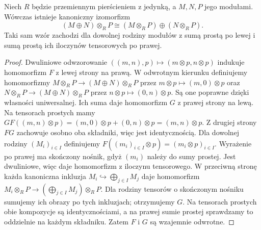 \begin{twierdzenie}
\label{aa:tw:tensor-direct-sum}
Niech $R$ będzie przemiennym pierścieniem z jedynką,
a $M,N,P$ jego modułami. Wówczas istnieje kanoniczny izomorfizm
\[
 (M\oplus N)\otimes_R P\cong
 (M\otimes_RP)\oplus(N\otimes_RP).
\]
Taki sam wzór zachodzi dla dowolnej rodziny modułów
z sumą prostą po lewej i sumą prostą ich iloczynów
tensorowych po prawej.
\end{twierdzenie}
\begin{proof}
Dwuliniowe odwzorowanie
$((m,n),p)\mapsto(m\otimes p,n\otimes p)$
indukuje homomorfizm $F$ z lewej strony na prawą.
W odwrotnym kierunku definiujemy homomorfizmy
$M\otimes_RP\to(M\oplus N)\otimes_RP$ przez
$m\otimes p\mapsto(m,0)\otimes p$ oraz
$N\otimes_RP\to(M\oplus N)\otimes_RP$ przez
$n\otimes p\mapsto(0,n)\otimes p$.
Są one poprawne dzięki własności uniwersalnej.
Ich suma daje homomorfizm $G$ z prawej strony na lewą.
Na tensorach prostych mamy
$GF((m,n)\otimes p)=(m,0)\otimes p+(0,n)\otimes p
=(m,n)\otimes p$.
Z drugiej strony $FG$ zachowuje osobno oba składniki,
więc jest identycznością. Dla dowolnej rodziny $(M_i)_{i\in I}$ definiujemy
$F((m_i)_{i\in I}\otimes p)=(m_i\otimes p)_{i\in I}$.
Wyrażenie po prawej ma skończony nośnik, gdyż
$(m_i)$ należy do sumy prostej. Jest dwuliniowe,
więc daje homomorfizm z iloczynu tensorowego.
W przeciwną stronę każda kanoniczna inkluzja
$M_i\hookrightarrow\bigoplus_{j\in I}M_j$ daje
homomorfizm $M_i\otimes_RP\to
(\bigoplus_{j\in I}M_j)\otimes_RP$.
Dla rodziny tensorów o skończonym nośniku sumujemy
ich obrazy po tych inkluzjach; otrzymujemy $G$.
Na tensorach prostych obie kompozycje są
identycznościami, a na prawej sumie prostej
sprawdzamy to oddzielnie na każdym składniku.
Zatem $F$ i $G$ są wzajemnie odwrotne.
\end{proof}

